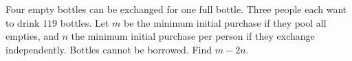 Four empty bottles can be exchanged for one full bottle. Three people each want to drink $119$ bottles. Let $m$ be the minimum initial purchase if they pool all empties, and $n$ the minimum initial purchase per person if they exchange independently. Bottles cannot be borrowed. Find $m-2n$.
